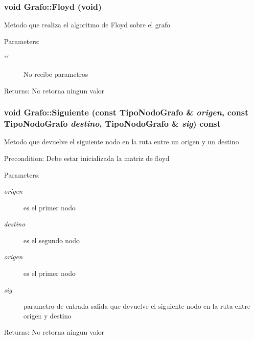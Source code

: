 \subsubsection{\setlength{\rightskip}{0pt plus 5cm}void Grafo::Floyd (void)}\label{classGrafo_6ea9d2c7f7ebf7ae473d0bc42041cb4f}


Metodo que realiza el algoritmo de Floyd sobre el grafo \begin{Desc}
\item[Parameters:]
\begin{description}
\item[{\em \char`\"{}\char`\"{}}]No recibe parametros \end{description}
\end{Desc}
\begin{Desc}
\item[Returns:]No retorna ningun valor \end{Desc}
\subsubsection{\setlength{\rightskip}{0pt plus 5cm}void Grafo::Siguiente (const {\bf TipoNodoGrafo} \& {\em origen}, const {\bf TipoNodoGrafo} {\em destino}, {\bf TipoNodoGrafo} \& {\em sig}) const}\label{classGrafo_4c0ba27c2dd5a3677e66af2acdb348e4}


Metodo que devuelve el siguiente nodo en la ruta entre un origen y un destino \begin{Desc}
\item[Precondition:]Debe estar inicializada la matriz de floyd \end{Desc}
\begin{Desc}
\item[Parameters:]
\begin{description}
\item[{\em origen}]es el primer nodo \item[{\em destino}]es el segundo nodo \item[{\em origen}]es el primer nodo \item[{\em sig}]parametro de entrada salida que devuelve el siguiente nodo en la ruta entre origen y destino \end{description}
\end{Desc}
\begin{Desc}
\item[Returns:]No retorna ningun valor \end{Desc}
